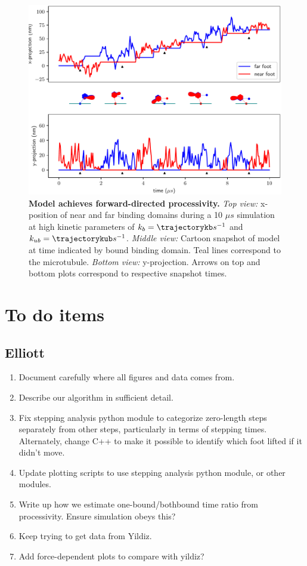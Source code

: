 \documentclass[9pt,twocolumn,twoside]{pnas-new}
\begin{document}
\begin{figure}[tbhp]
\centering
\includegraphics[width=\linewidth]{../../plots/paper_trajectory_plot.pdf}
\caption{\textbf{Model achieves forward-directed processivity.} \textit{Top view:} x-position of near and far binding domains during a 10 $\mu s$ simulation at high kinetic parameters of $k_b = \trajectorykb s^{-1}$ and $k_{ub} = \trajectorykub s^{-1}$. \textit{Middle view:} Cartoon snapshot of model at time indicated by bound binding domain. Teal lines correspond to the microtubule. \textit{Bottom view:} y-projection. Arrows on top and bottom plots correspond to respective snapshot times.}
\label{fig:trajectory}
\end{figure}

\section{To do items}

\subsection{Elliott}
\begin{enumerate}
\item Document carefully where all figures and data comes from.
\item Describe our algorithm in sufficient detail.
\item Fix stepping analysis python module to categorize zero-length
  steps separately from other steps, particularly in terms of stepping
  times.  Alternately, change C++ to make it possible to identify
  which foot lifted if it didn't move.
\item Update plotting scripts to use stepping analysis python module,
  or other modules.
\item Write up how we estimate one-bound/bothbound time ratio from
  processivity.  Ensure simulation obeys this?
\item Keep trying to get data from Yildiz.
\item Add force-dependent plots to compare with yildiz?
\end{enumerate}
\end{document}
